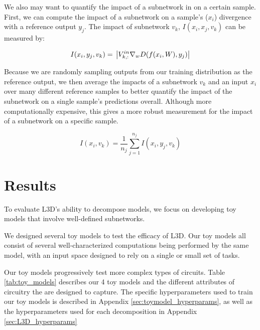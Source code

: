 \documentclass{article}
\theoremstyle{plain}
\theoremstyle{definition}
\theoremstyle{remark}
\begin{document}
We also may want to quantify the impact of a subnetwork in on a certain sample. First, we can compute the impact of a subnetwork on a sample's ($x_i$) divergence with a reference output $y_j$. The impact of subnetwork $v_k$, $I(x_i, x_j, v_k)$ can be measured by:

\begin{equation}
    I(x_i, y_j, v_k) = \\
    \left| V^{in}_{k,:} \nabla_w D(f(x_i, W), y_j) \right|
\end{equation}

Because we are randomly sampling outputs from our training distribution as the reference output, we then average the impacts of a subnetwork $v_k$ and an input $x_i$ over many different reference samples to better quantify the impact of the subnetwork on a single sample's predictions overall. Although more computationally expensive, this gives a more robust measurement for the impact of a subnetwork on a specific sample. 

\begin{equation}
    I(x_i, v_k) = \frac{1}{n_j} \sum_{j=1}^{n_j} I(x_i, y_j, v_k)
\end{equation}

\section{Results}\label{sec:results}

To evaluate L3D's ability to decompose models, we focus on developing toy models that involve well-defined subnetworks.

We designed several toy models to test the efficacy of L3D. Our toy models all consist of several well-characterized computations being performed by the same model, with an input space designed to rely on a single or small set of tasks. 

Our toy models progressively test more complex types of circuits. Table \ref{tab:toy_models} describes our 4 toy models and the different attributes of circuitry the are designed to capture. The specific hyperparameters used to train our toy models is described in Appendix \ref{sec:toymodel_hyperparams}, as well as the hyperparameters used for each decomposition in Appendix \ref{sec:L3D_hyperparams}
\end{document}
